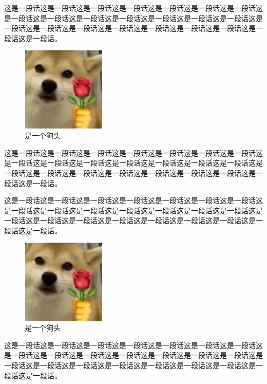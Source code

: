\documentclass[normalsize]{article}   %
\begin{document}
		\newpage
			这是一段话这是一段话这是一段话这是一段话这是一段话这是一段话这是一段话这是一段话这是一段话这是一段话这是一段话这是一段话这是一段话这是一段话这是一段话这是一段话这是一段话这是一段话这是一段话这是一段话这是一段话这是一段话这是一段话。
			\begin{figure}[p]
			\centering
			\includegraphics[height=4cm,width=4cm]{./img/sample.png}%
			\caption{是一个狗头}
			\label{fig:10}
		\end{figure}
		这是一段话这是一段话这是一段话这是一段话这是一段话这是一段话这是一段话这是一段话这是一段话这是一段话这是一段话这是一段话这是一段话这是一段话这是一段话这是一段话这是一段话这是一段话这是一段话这是一段话这是一段话这是一段话这是一段话。
		
		
		
		
		
		\newpage
		
		这是一段话这是一段话这是一段话这是一段话这是一段话这是一段话这是一段话这是一段话这是一段话这是一段话这是一段话这是一段话这是一段话这是一段话这是一段话这是一段话这是一段话这是一段话这是一段话这是一段话这是一段话这是一段话这是一段话。
		
			\begin{figure}[htbp!]
			\centering
			\includegraphics[height=4cm,width=4cm]{./img/sample.png}%
			\caption{是一个狗头}
			\label{fig:10}
		\end{figure}
	
	这是一段话这是一段话这是一段话这是一段话这是一段话这是一段话这是一段话这是一段话这是一段话这是一段话这是一段话这是一段话这是一段话这是一段话这是一段话这是一段话这是一段话这是一段话这是一段话这是一段话这是一段话这是一段话这是一段话。
		\newpage
\end{document}
